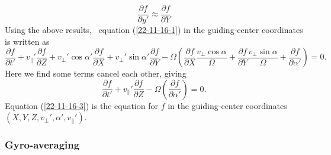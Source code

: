 \documentclass{article}
\begin{document}
\begin{equation}
  \frac{\partial f}{\partial y'} \approx \frac{\partial f}{\partial Y}
\end{equation}
Using the above results, \ equation (\ref{22-11-16-1}) in the guiding-center
coordinates is written as
\begin{equation}
  \frac{\partial f}{\partial t'} + v_{\parallel}' \frac{\partial f}{\partial
  Z} + v_{\perp}' \cos \alpha' \frac{\partial f}{\partial X} + v_{\perp}' \sin
  \alpha' \frac{\partial f}{\partial Y} - \Omega \left( \frac{\partial
  f}{\partial X} \frac{v_{\perp} \cos \alpha}{\Omega} + \frac{\partial
  f}{\partial Y} \frac{v_{\perp} \sin \alpha}{\Omega} + \frac{\partial
  f}{\partial \alpha'} \right) = 0.
\end{equation}
Here we find some terms cancel each other, giving
\begin{equation}
  \label{22-11-16-3} \frac{\partial f}{\partial t'} + v_{\parallel}'
  \frac{\partial f}{\partial Z} - \Omega \left( \frac{\partial f}{\partial
  \alpha'} \right) = 0.
\end{equation}
Equation (\ref{22-11-16-3}) is the equation for $f$ in the guiding-center
coordinates $(X, Y, Z, v_{\perp}', \alpha', v_{\parallel}')$.

\subsubsection{Gyro-averaging}
\end{document}
